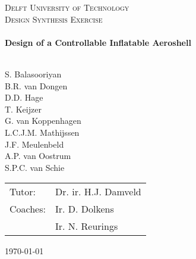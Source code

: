 \begin{titlepage}
\begin{center}
\AddToShipoutPicture*{\BackgroundPic}
\color{white}
\textsc{\LARGE Delft University of Technology}\\[0.3cm]
\textsc{\Large Design Synthesis Exercise}\\[0.5cm]

\vspace{5cm}
\HRule \\[0.4cm]
{\LARGE \bfseries Design of a Controllable Inflatable Aeroshell}\\[0.2cm]
\HRule \\[0.5cm]


\begin{flushleft}
\vspace{7cm}

S. Balasooriyan \\ B.R. van Dongen \\ D.D. Hage \\ T. Keijzer \\  G. van Koppenhagen \\ L.C.J.M. Mathijssen \\ J.F. Meulenbeld   \\ A.P. van Oostrum \\ S.P.C. van Schie\\
	\enlargethispage{15mm} \vspace{15mm}
	\hspace{-3.5mm}
	\begin{tabular}{l l}
		Tutor: & Dr. ir. H.J. Damveld \\
		Coaches: & Ir. D. Dolkens \\ 
		& Ir. N. Reurings \\
	\end{tabular}
\vfill
\begin{large}\today \end{large}
\end{flushleft}
\end{center}
\end{titlepage}